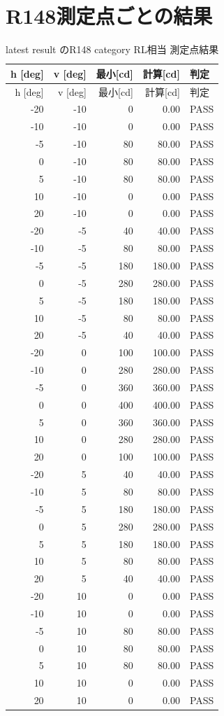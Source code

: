\documentclass[11pt,a4paper]{article}
\newcommand{\pass}{\textcolor{green!45!black}{PASS}}
\begin{document}
\section{R148測定点ごとの結果}
\begin{longtable}{rrrrl}
\caption{latest result のR148 category RL相当 測定点結果}\\
\toprule
h [deg] & v [deg] & 最小[cd] & 計算[cd] & 判定\\
\midrule
\endfirsthead
\toprule
h [deg] & v [deg] & 最小[cd] & 計算[cd] & 判定\\
\midrule
\endhead
-20 & -10 & 0 & 0.00 & \pass\\
-10 & -10 & 0 & 0.00 & \pass\\
-5 & -10 & 80 & 80.00 & \pass\\
0 & -10 & 80 & 80.00 & \pass\\
5 & -10 & 80 & 80.00 & \pass\\
10 & -10 & 0 & 0.00 & \pass\\
20 & -10 & 0 & 0.00 & \pass\\
-20 & -5 & 40 & 40.00 & \pass\\
-10 & -5 & 80 & 80.00 & \pass\\
-5 & -5 & 180 & 180.00 & \pass\\
0 & -5 & 280 & 280.00 & \pass\\
5 & -5 & 180 & 180.00 & \pass\\
10 & -5 & 80 & 80.00 & \pass\\
20 & -5 & 40 & 40.00 & \pass\\
-20 & 0 & 100 & 100.00 & \pass\\
-10 & 0 & 280 & 280.00 & \pass\\
-5 & 0 & 360 & 360.00 & \pass\\
0 & 0 & 400 & 400.00 & \pass\\
5 & 0 & 360 & 360.00 & \pass\\
10 & 0 & 280 & 280.00 & \pass\\
20 & 0 & 100 & 100.00 & \pass\\
-20 & 5 & 40 & 40.00 & \pass\\
-10 & 5 & 80 & 80.00 & \pass\\
-5 & 5 & 180 & 180.00 & \pass\\
0 & 5 & 280 & 280.00 & \pass\\
5 & 5 & 180 & 180.00 & \pass\\
10 & 5 & 80 & 80.00 & \pass\\
20 & 5 & 40 & 40.00 & \pass\\
-20 & 10 & 0 & 0.00 & \pass\\
-10 & 10 & 0 & 0.00 & \pass\\
-5 & 10 & 80 & 80.00 & \pass\\
0 & 10 & 80 & 80.00 & \pass\\
5 & 10 & 80 & 80.00 & \pass\\
10 & 10 & 0 & 0.00 & \pass\\
20 & 10 & 0 & 0.00 & \pass\\
\bottomrule
\end{longtable}
\end{document}
